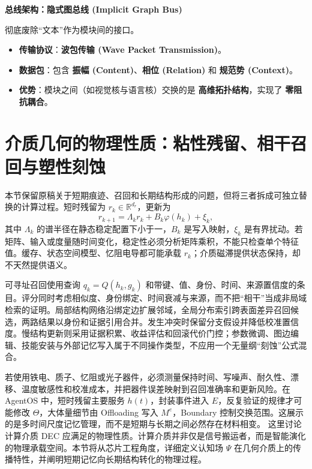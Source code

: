 \textbf{总线架构：隐式图总线 (Implicit Graph Bus)}

彻底废除“文本”作为模块间的接口。

\begin{itemize}
    \item   \textbf{传输协议}：\textbf{波包传输 (Wave Packet Transmission)}。
    \item   \textbf{数据包}：包含 \textbf{振幅 (Content)}、\textbf{相位 (Relation)} 和 \textbf{规范势 (Context)}。
    \item   \textbf{优势}：模块之间（如视觉核与语言核）交换的是 \textbf{高维拓扑结构}，实现了 \textbf{零阻抗耦合}。
\end{itemize}

\section{介质几何的物理性质：粘性残留、相干召回与塑性刻蚀}
\label{sec:medium_rheology_cim}

本节保留原稿关于短期痕迹、召回和长期结构形成的问题，但将三者拆成可独立替换的计算过程。短时残留为 $r_k\in\mathbb{R}^{d_r}$，更新为
\begin{equation}
r_{k+1}=\Lambda_k r_k+B_k\varphi(h_k)+\xi_k,
\end{equation}
其中 $\Lambda_k$ 的谱半径在静态稳定配置下小于一，$B_k$ 是写入映射，$\xi_k$ 是有界扰动。若矩阵、输入或度量随时间变化，稳定性必须分析矩阵乘积，不能只检查单个特征值。缓存、状态空间模型、忆阻电导都可能承载 $r_k$；介质磁滞提供状态保持，却不天然提供语义。

可寻址召回使用查询 $q_k=Q(h_k,g_k)$ 和带键、值、身份、时间、来源置信度的条目。评分同时考虑相似度、身份绑定、时间衰减与来源，而不把“相干”当成非局域检索的证明。局部结构网络沿绑定边扩展邻域，全局分布索引跨表面差异召回候选，两路结果以身份和证据引用合并。发生冲突时保留分支假设并降低校准置信度。慢结构更新则采用证据积累、收益评估和回滚代价门控；参数微调、图边编辑、技能安装与外部记忆写入属于不同操作类型，不应用一个无量纲“刻蚀”公式混合。

若使用铁电、质子、忆阻或光子器件，必须测量保持时间、写噪声、耐久性、漂移、温度敏感性和校准成本，并把器件误差映射到召回准确率和更新风险。在 AgentOS 中，短时残留主要服务 $h(t)$，封装事件进入 $E$，反复验证的规律才可能修改 $\Theta$，大体量细节由 Offloading 写入 $M^e$，Boundary 控制交换范围。这展示的是多时间尺度记忆管理，而不是短期与长期之间必然存在材料相变。
这里讨论计算介质 DEC 应满足的物理性质。计算介质并非仅是信号搬运者，而是智能演化的物理承载空间。本节将从芯片工程角度，详细定义认知场 $\Psi$ 在几何介质上的传播特性，并阐明短期记忆向长期结构转化的物理过程。

